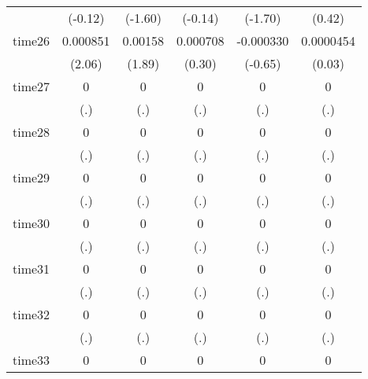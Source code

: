 \begin{table}[htbp]
\begin{tabular}{l*{5}{c}}
            &     (-0.12)         &     (-1.60)         &     (-0.14)         &     (-1.70)         &      (0.42)         \\
time26      &    0.000851\sym{*}  &     0.00158         &    0.000708         &   -0.000330         &   0.0000454         \\
            &      (2.06)         &      (1.89)         &      (0.30)         &     (-0.65)         &      (0.03)         \\
time27      &           0         &           0         &           0         &           0         &           0         \\
            &         (.)         &         (.)         &         (.)         &         (.)         &         (.)         \\
time28      &           0         &           0         &           0         &           0         &           0         \\
            &         (.)         &         (.)         &         (.)         &         (.)         &         (.)         \\
time29      &           0         &           0         &           0         &           0         &           0         \\
            &         (.)         &         (.)         &         (.)         &         (.)         &         (.)         \\
time30      &           0         &           0         &           0         &           0         &           0         \\
            &         (.)         &         (.)         &         (.)         &         (.)         &         (.)         \\
time31      &           0         &           0         &           0         &           0         &           0         \\
            &         (.)         &         (.)         &         (.)         &         (.)         &         (.)         \\
time32      &           0         &           0         &           0         &           0         &           0         \\
            &         (.)         &         (.)         &         (.)         &         (.)         &         (.)         \\
time33      &           0         &           0         &           0         &           0         &           0         \\

\end{tabular}
\end{table}
